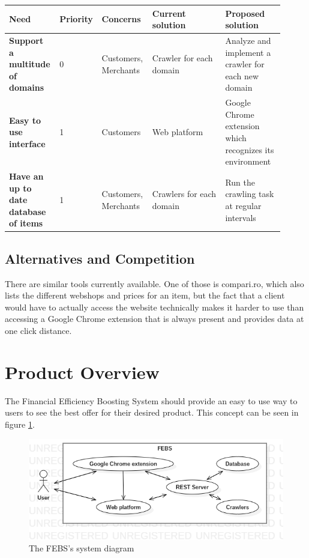 \documentclass[12pt,a4paper,twoside]{report}
\begin{document}
\begin{table}[H]
  \centering
  \begin{tabular}{| m{0.18\linewidth} | m{0.08\linewidth} | m{0.18\linewidth} | m{0.26\linewidth} | m{0.21\linewidth} | }
    \hline
    \rowcolor{lightgray} Need                     & Priority & Concerns             & Current solution         & Proposed solution                                        \\
    \hline
    \textbf{Support a multitude of domains}       & 0        & Customers, Merchants & Crawler for each domain  & Analyze and implement a crawler for each new domain      \\
    \hline
    \textbf{Easy to use interface}                & 1        & Customers            & Web platform             & Google Chrome extension which recognizes its environment \\
    \hline
    \textbf{Have an up to date database of items} & 1        & Customers, Merchants & Crawlers for each domain & Run the crawling task at regular intervals               \\
    \hline
  \end{tabular}
  \label{table:summary_of_key_stakeholder_or_user_needs}
\end{table}


\subsection{Alternatives and Competition}

There are similar tools currently available. One of those is compari.ro, which also lists the different webshops and prices for an item, but the fact that a client would have to actually access the website technically makes it harder to use than accessing a Google Chrome extension that is always present and provides data at one click distance.


\section{Product Overview}

The Financial Efficiency Boosting System should provide an easy to use way to users to see the best offer for their desired product. This concept can be seen in figure \ref{fig:system_diagram}.

\begin{figure}[H]
  \centering
  \includegraphics[width=\linewidth]{img/system_diagram.png}
  \caption{The FEBS's system diagram}
  \label{fig:system_diagram}
\end{figure}
\end{document}
